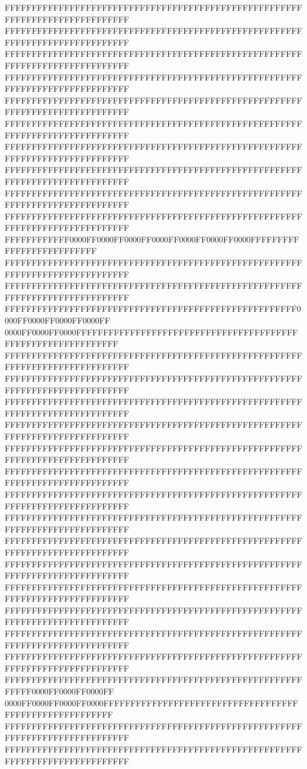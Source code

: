FFFFFFFFFFFFFFFFFFFFFFFFFFFFFFFFFFFFFFFFFFFFFFFFFFFFFFFFFFFFFFFFFFFFFFFFFFFFFF
FFFFFFFFFFFFFFFFFFFFFFFFFFFFFFFFFFFFFFFFFFFFFFFFFFFFFFFFFFFFFFFFFFFFFFFFFFFFFF
FFFFFFFFFFFFFFFFFFFFFFFFFFFFFFFFFFFFFFFFFFFFFFFFFFFFFFFFFFFFFFFFFFFFFFFFFFFFFF
FFFFFFFFFFFFFFFFFFFFFFFFFFFFFFFFFFFFFFFFFFFFFFFFFFFFFFFFFFFFFFFFFFFFFFFFFFFFFF
FFFFFFFFFFFFFFFFFFFFFFFFFFFFFFFFFFFFFFFFFFFFFFFFFFFFFFFFFFFFFFFFFFFFFFFFFFFFFF
FFFFFFFFFFFFFFFFFFFFFFFFFFFFFFFFFFFFFFFFFFFFFFFFFFFFFFFFFFFFFFFFFFFFFFFFFFFFFF
FFFFFFFFFFFFFFFFFFFFFFFFFFFFFFFFFFFFFFFFFFFFFFFFFFFFFFFFFFFFFFFFFFFFFFFFFFFFFF
FFFFFFFFFFFFFFFFFFFFFFFFFFFFFFFFFFFFFFFFFFFFFFFFFFFFFFFFFFFFFFFFFFFFFFFFFFFFFF
FFFFFFFFFFFFFFFFFFFFFFFFFFFFFFFFFFFFFFFFFFFFFFFFFFFFFFFFFFFFFFFFFFFFFFFFFFFFFF
FFFFFFFFFFFFFFFFFFFFFFFFFFFFFFFFFFFFFFFFFFFFFFFFFFFFFFFFFFFFFFFFFFFFFFFFFFFFFF
FFFFFFFFFFFF0000FF0000FF0000FF0000FF0000FF0000FF0000FFFFFFFFFFFFFFFFFFFFFFFFFF
FFFFFFFFFFFFFFFFFFFFFFFFFFFFFFFFFFFFFFFFFFFFFFFFFFFFFFFFFFFFFFFFFFFFFFFFFFFFFF
FFFFFFFFFFFFFFFFFFFFFFFFFFFFFFFFFFFFFFFFFFFFFFFFFFFFFFFFFFFFFFFFFFFFFFFFFFFFFF
FFFFFFFFFFFFFFFFFFFFFFFFFFFFFFFFFFFFFFFFFFFFFFFFFFFFFF0000FF0000FF0000FF0000FF
0000FF0000FF0000FFFFFFFFFFFFFFFFFFFFFFFFFFFFFFFFFFFFFFFFFFFFFFFFFFFFFFFFFFFFFF
FFFFFFFFFFFFFFFFFFFFFFFFFFFFFFFFFFFFFFFFFFFFFFFFFFFFFFFFFFFFFFFFFFFFFFFFFFFFFF
FFFFFFFFFFFFFFFFFFFFFFFFFFFFFFFFFFFFFFFFFFFFFFFFFFFFFFFFFFFFFFFFFFFFFFFFFFFFFF
FFFFFFFFFFFFFFFFFFFFFFFFFFFFFFFFFFFFFFFFFFFFFFFFFFFFFFFFFFFFFFFFFFFFFFFFFFFFFF
FFFFFFFFFFFFFFFFFFFFFFFFFFFFFFFFFFFFFFFFFFFFFFFFFFFFFFFFFFFFFFFFFFFFFFFFFFFFFF
FFFFFFFFFFFFFFFFFFFFFFFFFFFFFFFFFFFFFFFFFFFFFFFFFFFFFFFFFFFFFFFFFFFFFFFFFFFFFF
FFFFFFFFFFFFFFFFFFFFFFFFFFFFFFFFFFFFFFFFFFFFFFFFFFFFFFFFFFFFFFFFFFFFFFFFFFFFFF
FFFFFFFFFFFFFFFFFFFFFFFFFFFFFFFFFFFFFFFFFFFFFFFFFFFFFFFFFFFFFFFFFFFFFFFFFFFFFF
FFFFFFFFFFFFFFFFFFFFFFFFFFFFFFFFFFFFFFFFFFFFFFFFFFFFFFFFFFFFFFFFFFFFFFFFFFFFFF
FFFFFFFFFFFFFFFFFFFFFFFFFFFFFFFFFFFFFFFFFFFFFFFFFFFFFFFFFFFFFFFFFFFFFFFFFFFFFF
FFFFFFFFFFFFFFFFFFFFFFFFFFFFFFFFFFFFFFFFFFFFFFFFFFFFFFFFFFFFFFFFFFFFFFFFFFFFFF
FFFFFFFFFFFFFFFFFFFFFFFFFFFFFFFFFFFFFFFFFFFFFFFFFFFFFFFFFFFFFFFFFFFFFFFFFFFFFF
FFFFFFFFFFFFFFFFFFFFFFFFFFFFFFFFFFFFFFFFFFFFFFFFFFFFFFFFFFFFFFFFFFFFFFFFFFFFFF
FFFFFFFFFFFFFFFFFFFFFFFFFFFFFFFFFFFFFFFFFFFFFFFFFFFFFFFFFFFFFFFFFFFFFFFFFFFFFF
FFFFFFFFFFFFFFFFFFFFFFFFFFFFFFFFFFFFFFFFFFFFFFFFFFFFFFFFFFFFFFFFFFFFFFFFFFFFFF
FFFFFFFFFFFFFFFFFFFFFFFFFFFFFFFFFFFFFFFFFFFFFFFFFFFFFFFFFFFF0000FF0000FF0000FF
0000FF0000FF0000FF0000FFFFFFFFFFFFFFFFFFFFFFFFFFFFFFFFFFFFFFFFFFFFFFFFFFFFFFFF
FFFFFFFFFFFFFFFFFFFFFFFFFFFFFFFFFFFFFFFFFFFFFFFFFFFFFFFFFFFFFFFFFFFFFFFFFFFFFF
FFFFFFFFFFFFFFFFFFFFFFFFFFFFFFFFFFFFFFFFFFFFFFFFFFFFFFFFFFFFFFFFFFFFFFFFFFFFFF
